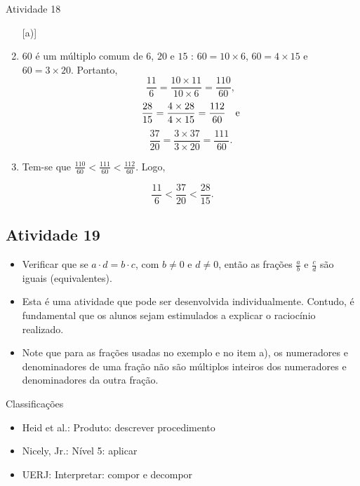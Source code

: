 \documentclass[oneside]{book}
\begin{document}
\begin{multicols}{2}
\begin{resposta*}{Atividade 18}
\begin{enumerate} [\quad a)] %
    \item             $60$       é um múltiplo comum de       $6$,       $20$    
   e       $15$      :       $60 = 10 \times 6$,       $60 = 4 \times 15$       
e       $60 = 3 \times 20$. Portanto,       $$\frac{11}{6} = \frac{10 \times 
11}{10 \times 6} = \frac{110}{60},$$             $$\frac{28}{15} = \frac{4 
\times 28}{4 \times 15} = \frac{112}{60} \quad {\rm  e}$$             
$$\frac{37}{20} = \frac{3 \times 37}{3 \times 20} = \frac{111}{60}.$$      
\mbox{} \newline 
    \item       Tem-se que       $\frac{110}{60} < \frac{111}{60} < 
\frac{112}{60}$. Logo,
\end{enumerate} %
  
  $$\frac{11}{6} < \frac{37}{20} < \frac{28}{15}.$$  
\end{resposta*}

\subsection{Atividade 19}

\begin{itemize} %
    \item       Verificar que se       $a \cdot d = b \cdot c$, com       $b 
\not = 0$       e       $d \not = 0$, então as frações       $\frac{a}{b}$       
e       $\frac{c}{d}$       são iguais (equivalentes).
\end{itemize} %
  
  
 
\begin{itemize} %
    \item       Esta é uma atividade que pode ser desenvolvida individualmente. 
Contudo, é fundamental que os alunos sejam estimulados a explicar o raciocínio 
realizado.
    \item       Note que para as frações usadas no exemplo e no item a), os 
numeradores e denominadores de uma fração não são múltiplos inteiros dos 
numeradores e denominadores da outra fração.
\end{itemize} %
  
  
  Classificações  
\begin{itemize} %
    \item       Heid et al.: Produto: descrever procedimento
    \item       Nicely, Jr.: Nível 5: aplicar
    \item       UERJ: Interpretar: compor e decompor
\end{itemize} %


\end{multicols}
\end{document}
